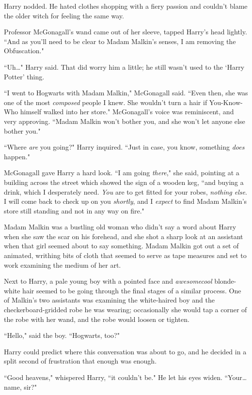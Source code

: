 Harry nodded. He hated clothes shopping with a fiery passion and couldn't blame the older witch for feeling the same way.

Professor McGonagall's wand came out of her sleeve, tapped Harry's head lightly. ``And as you'll need to be clear to Madam Malkin's senses, I am removing the Obfuscation."

``Uh{\ldots}" Harry said. That did worry him a little; he still wasn't used to the `Harry Potter' thing.

``I went to Hogwarts with Madam Malkin," McGonagall said. ``Even then, she was one of the most \emph{composed} people I knew. She wouldn't turn a hair if You-Know-Who himself walked into her store." McGonagall's voice was reminiscent, and very approving. ``Madam Malkin won't bother you, and she won't let anyone else bother you."

``Where \emph{are} you going?" Harry inquired. ``Just in case, you know, something \emph{does} happen."

McGonagall gave Harry a hard look. ``I am going \emph{there}," she said, pointing at a building across the street which showed the sign of a wooden keg, ``and buying a drink, which I desperately need. \emph{You} are to get fitted for your robes, \emph{nothing else}. I will come back to check up on you \emph{shortly}, and I \emph{expect} to find Madam Malkin's store still standing and not in any way on fire."

Madam Malkin was a bustling old woman who didn't say a word about Harry when she saw the scar on his forehead, and she shot a sharp look at an assistant when that girl seemed about to say something. Madam Malkin got out a set of animated, writhing bits of cloth that seemed to serve as tape measures and set to work examining the medium of her art.

Next to Harry, a pale young boy with a pointed face and \emph{awesomecool} blonde-white hair seemed to be going through the final stages of a similar process. One of Malkin's two assistants was examining the white-haired boy and the checkerboard-gridded robe he was wearing; occasionally she would tap a corner of the robe with her wand, and the robe would loosen or tighten.

``Hello," said the boy. ``Hogwarts, too?"

Harry could predict where this conversation was about to go, and he decided in a split second of frustration that enough was enough.

``Good heavens," whispered Harry, ``it couldn't be." He let his eyes widen. ``Your{\ldots} name, sir?"

